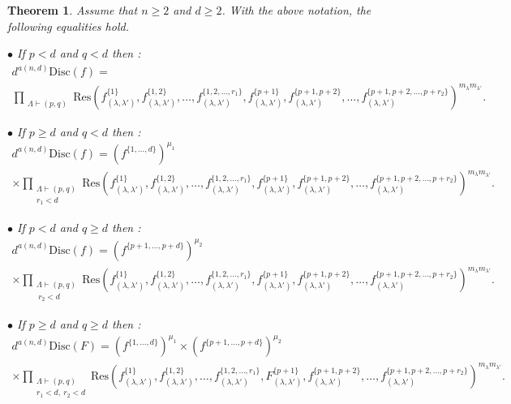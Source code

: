 \documentclass[12pt,a4paper,reqno]{amsart}
\newtheorem{theorem}{Theorem}[section]
\theoremstyle{definition}
\theoremstyle{remark}
\numberwithin{equation}{section}
\newcommand{\Res}{\mathrm{Res}}
\newcommand{\Disc}{\mathrm{Disc}}
\begin{document}
\begin{theorem}\label{thm:discmaintheorem} Assume that $n\geq 2$ and $d\geq 2$. With the above notation, the following equalities hold.

\noindent $\bullet$ If $p< d$ and $q< d$ then :
\begin{multline*}
d^{a(n,d)}\Disc\left(f\right)=\\
 \prod_{\substack{\Lambda\vdash (p,q)}}
\Res\left( f_{(\lambda,\lambda')}^{\{1\}}, f_{(\lambda,\lambda')}^{\{1,2\}}, \ldots, f_{(\lambda,\lambda')}^{\{1,2,\ldots,r_1\}},f_{(\lambda,\lambda')}^{\{p+1\}}, f_{(\lambda,\lambda')}^{\{p+1,p+2\}}, \ldots, f_{(\lambda,\lambda')}^{\{p+1,p+2,\ldots,p+r_2\}} 
\right)^{m_{\lambda}m_{\lambda'}}.
\end{multline*}


\noindent $\bullet$ If $p\geqslant d$ and $q< d$ then :
\begin{multline*}
d^{a(n,d)}\Disc\left(f\right)=
  \left(f^{\{1,\ldots,d\}}\right)^{\mu_1}\\ \times\prod_{\substack{\Lambda\vdash (p,q)\\ r_1< d}}
\Res\left( f_{(\lambda,\lambda')}^{\{1\}}, f_{(\lambda,\lambda')}^{\{1,2\}}, \ldots, f_{(\lambda,\lambda')}^{\{1,2,\ldots,r_1\}},f_{(\lambda,\lambda')}^{\{p+1\}}, f_{(\lambda,\lambda')}^{\{p+1,p+2\}}, \ldots, f_{(\lambda,\lambda')}^{\{p+1,p+2,\ldots,p+r_2\}} 
\right)^{m_{\lambda}m_{\lambda'}}.
\end{multline*}

\noindent $\bullet$ If $p< d$ and $q\geqslant d$ then :
\begin{multline*}
d^{a(n,d)}\Disc\left(f\right)=
  \left(f^{\{p+1,\ldots,p+d\}}\right)^{\mu_2}\\ \times\prod_{\substack{\Lambda\vdash (p,q)\\ \ r_2< d}}
\Res\left( f_{(\lambda,\lambda')}^{\{1\}}, f_{(\lambda,\lambda')}^{\{1,2\}}, \ldots, f_{(\lambda,\lambda')}^{\{1,2,\ldots,r_1\}},f_{(\lambda,\lambda')}^{\{p+1\}}, f_{(\lambda,\lambda')}^{\{p+1,p+2\}}, \ldots, f_{(\lambda,\lambda')}^{\{p+1,p+2,\ldots,p+r_2\}} 
\right)^{m_{\lambda}m_{\lambda'}}.
\end{multline*}

\noindent $\bullet$ If $p\geqslant d$ and $q\geqslant d$ then :
\begin{multline*}
d^{a(n,d)}\Disc\left(F\right)=
  \left(f^{\{1,\ldots,d\}}\right)^{\mu_1}\times \left(f^{\{p+1,\ldots,p+d\}}\right)^{\mu_2}\\ \times\prod_{\substack{\Lambda\vdash (p,q)\\ r_1< d,\ r_2< d}}
\Res\left( f_{(\lambda,\lambda')}^{\{1\}}, f_{(\lambda,\lambda')}^{\{1,2\}}, \ldots, f_{(\lambda,\lambda')}^{\{1,2,\ldots,r_1\}},F_{(\lambda,\lambda')}^{\{p+1\}}, f_{(\lambda,\lambda')}^{\{p+1,p+2\}}, \ldots, f_{(\lambda,\lambda')}^{\{p+1,p+2,\ldots,p+r_2\}} 
\right)^{m_{\lambda}m_{\lambda'}}.
\end{multline*}


\end{theorem}
\end{document}
